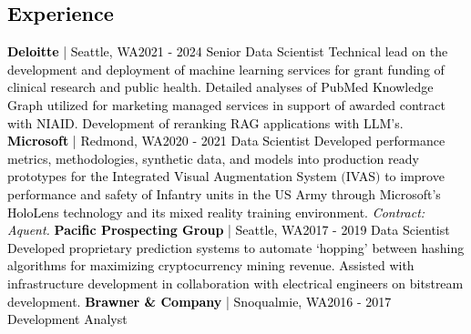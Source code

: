 \documentclass{article}
\begin{document}
    \begin{bgbox}[
        height = \paperheight,
        width = 0.69\textwidth,
        colback = white
    ]
    \linespread{0.95}
        \textcolor{black}{
            \section*{Experience}
                \textbf{Deloitte} | Seattle, WA\hfill{2021 - 2024}\newline
                    Senior Data Scientist\newline\newline
                Technical lead on the development and deployment of machine learning services for grant funding of clinical research and public health. Detailed analyses of PubMed Knowledge Graph utilized for marketing managed services in support of awarded contract with NIAID. Development of reranking RAG applications with LLM's.\newline\newline
                \textbf{Microsoft} | Redmond, WA\hfill{2020 - 2021}\newline
                    Data Scientist\newline\newline
                Developed performance metrics, methodologies, synthetic data, and models into production ready prototypes for the Integrated Visual Augmentation System $($IVAS$)$ to improve performance and safety of Infantry units in the US Army through Microsoft’s HoloLens technology and its mixed reality training environment. \textit{Contract: Aquent.}\newline\newline
                \textbf{Pacific Prospecting Group} | Seattle, WA\hfill{2017 - 2019}\newline
                    Data Scientist\newline\newline
                Developed proprietary prediction systems to automate ‘hopping’ between hashing algorithms for maximizing cryptocurrency mining revenue. Assisted with infrastructure development in collaboration with electrical engineers on bitstream development.\newline\newline
                \textbf{Brawner \& Company} | Snoqualmie, WA\hfill{2016 - 2017}\newline
                    Development Analyst\newline\newline
}
\end{bgbox}
\end{document}
